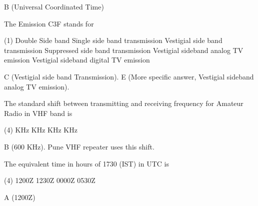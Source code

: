 \documentclass[a4paper]{article}
\begin{document}
\begin{solution}
	B (Universal Coordinated Time)
\end{solution}

\vspace{5mm}



\begin{question}The Emission \apostrophe{}C3F\apostrophe{} stands for \spaces
	\begin{tasks}(1)
		\task Double Side band
		\task Single side band transmission
		\task Vestigial side band transmission
		\task Suppressed side band transmission
		\task Vestigial sideband analog TV emission
		\task Vestigial sideband digital TV emission
	\end{tasks}
\end{question}

\begin{solution}
	C (Vestigial side band Transmission). E (More specific answer, Vestigial sideband analog TV emission).
\end{solution}

\vspace{5mm}



\begin{question}The standard shift between transmitting and receiving frequency for Amateur Radio in VHF band is \spaces
	\begin{tasks}(4)
		 KHz
		 KHz
		 KHz
		 KHz
	\end{tasks}
\end{question}

\begin{solution}
	B (600 KHz). Pune VHF repeater uses this shift.
\end{solution}

\vspace{5mm}



\begin{question}The equivalent time in hours of 1730 (IST) in UTC is \spaces
	\begin{tasks}(4)
		\task 1200Z
		\task 1230Z
		\task 0000Z
		\task 0530Z
	\end{tasks}
\end{question}

\begin{solution}
	A (1200Z)
\end{solution}

\vspace{5mm}
\end{document}
